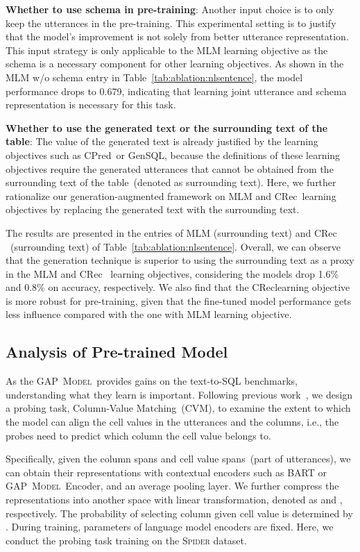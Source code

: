 \documentclass[letterpaper]{article} \usepackage{aaai21}  \usepackage{times}  \usepackage{helvet} \usepackage{courier}  \usepackage[hyphens]{url}  \usepackage{graphicx} \usepackage{booktabs}
\newcommand{\modelnamelm}{\textsc{GAP~Model}}
\newcommand{\colpred}{CPred}
\newcommand{\colrec}{CRec}
\newcommand{\gensql}{GenSQL}
\begin{document}
\smallskip \noindent \textbf{Whether to use schema in pre-training}: Another input choice is to only keep the utterances in the pre-training.
This experimental setting is to justify that the model's improvement is not solely from better utterance representation.
This input strategy is only applicable to the MLM learning objective as the schema is a necessary component for other learning objectives.
As shown in the MLM w/o schema entry in Table~\ref{tab:ablation:nlsentence}, the model performance drops to 0.679, indicating that learning joint utterance and schema representation is necessary for this task.

\smallskip \noindent \textbf{Whether to use the generated text or the surrounding text of the table}: 
The value of the generated text is already justified by the learning objectives such as \colpred~or \gensql, because the definitions of these learning objectives require the generated utterances that cannot be obtained from the surrounding text of the table~(denoted as surrounding text).
Here, we further rationalize our generation-augmented framework on MLM and \colrec~learning objectives by replacing the generated text with the surrounding text.

The results are presented in the entries of MLM (surrounding text) and \colrec 
~(surrounding text) of Table~\ref{tab:ablation:nlsentence}.
Overall, we can observe that the generation technique is superior to using the surrounding text as a proxy in the MLM and \colrec~ learning objectives, considering the models drop 1.6\% and 0.8\% on accuracy, respectively.
We also find that the \colrec learning objective is more robust for pre-training, given that the fine-tuned model performance gets less influence compared with the one with MLM learning objective.

\subsection{Analysis of Pre-trained Model}

As the \modelnamelm~provides gains on the text-to-SQL benchmarks, understanding what they learn is important.
Following previous work~\cite{liu2019linguistic, hewitt2019designing, hewitt2019structural},
we design a probing task, Column-Value Matching~(CVM), 
to examine the extent to which the model can align the cell values in the utterances and the columns, i.e., the probes need to predict which column the cell value belongs to.

Specifically, given the column spans and cell value spans~(part of utterances), we can obtain their representations with contextual encoders such as BART or \modelnamelm~Encoder, and an average pooling layer.
We further compress the representations into another space with linear transformation, denoted as  and , respectively. 
The probability of selecting column  given cell value  is determined by .
During training, parameters of language model encoders are fixed.
Here, we conduct the probing task training on the \textsc{Spider} dataset.
\end{document}
